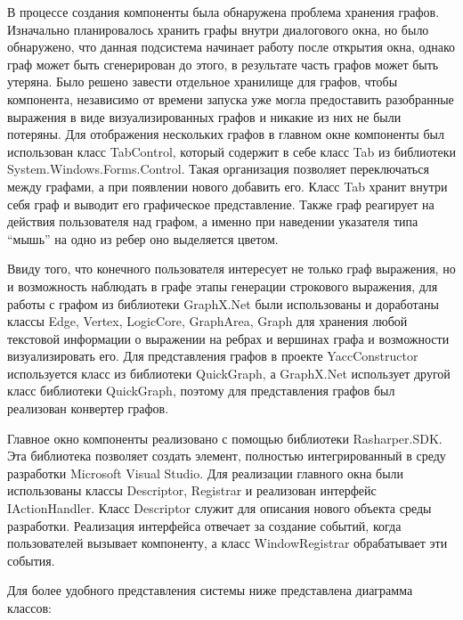 \documentclass{matmex-diploma}
\begin{document}
В процессе создания компоненты была обнаружена проблема хранения графов. Изначально планировалось хранить графы внутри диалогового окна, но было обнаружено, что данная подсистема начинает работу после открытия окна, однако граф может быть сгенерирован до этого, в результате часть графов может быть утеряна. Было решено завести отдельное хранилище для графов, чтобы компонента, независимо от времени запуска уже могла предоставить разобранные выражения  в  виде визуализированных графов и никакие из них не были потеряны. Для отображения нескольких графов в главном окне компоненты был использован класс TabControl, который содержит в себе класс Tab из библиотеки System.Windows.Forms.Control. Такая организация позволяет переключаться между графами, а при появлении нового добавить его. Класс Tab хранит внутри себя граф и выводит его графическое представление. Также граф реагирует на действия пользователя над графом, а именно при наведении указателя типа “мышь” на одно из ребер оно выделяется цветом. 

Ввиду того, что конечного пользователя интересует не только граф выражения, но и возможность наблюдать в графе этапы генерации строкового выражения, для работы с графом из библиотеки GraphX.Net были использованы и доработаны классы Edge, Vertex, LogicCore, GraphArea, Graph для хранения любой текстовой информации о выражении на ребрах и вершинах графа и возможности визуализировать его. Для представления графов в проекте YaccConstructor используется класс из библиотеки QuickGraph, а GraphX.Net использует другой класс библиотеки QuickGraph, поэтому для представления графов был реализован конвертер графов. 

Главное окно компоненты реализовано с помощью библиотеки Rasharper.SDK. Эта библиотека позволяет создать	 элемент, полностью интегрированный в среду разработки Microsoft Visual Studio. Для реализации главного окна были использованы классы Descriptor, Registrar и реализован интерфейс IActionHandler. Класс Descriptor служит для описания нового объекта среды разработки. Реализация интерфейса отвечает за создание событий, когда пользователей вызывает компоненту, а класс WindowRegistrar обрабатывает эти события.

Для более удобного представления системы ниже представлена диаграмма классов:
\end{document}
